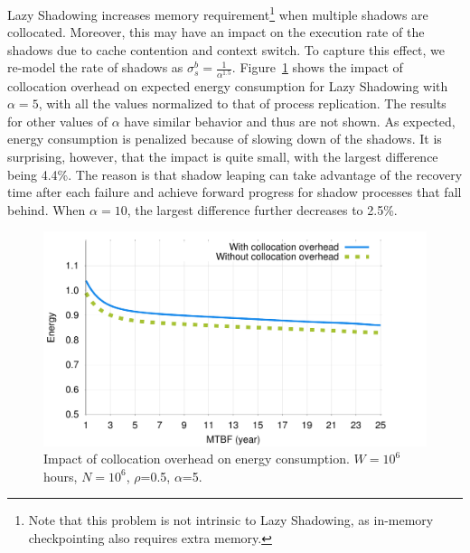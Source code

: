 
Lazy Shadowing increases memory requirement\footnote{Note that this problem is not intrinsic to Lazy Shadowing, as in-memory checkpointing also requires extra memory.} when multiple shadows are collocated. Moreover, this may have an impact on the execution rate of the shadows due to cache contention and context switch. 
To capture this effect,  
we re-model the rate of shadows as $\sigma_s^b=\frac{1}{\alpha^{1.5}}$.
Figure~\ref{fig:comp_vary_fail_speed} shows the impact of collocation overhead on expected energy consumption for Lazy Shadowing with $\alpha=5$, with all the values normalized to that of process replication. The results for other values of $\alpha$ have similar behavior and thus are not shown. As expected, energy consumption is penalized because
of slowing down of the shadows. It is surprising, however, that the impact is quite small, with the largest difference being 4.4\%. The reason is that shadow leaping can take advantage of the recovery time after each failure and achieve forward progress for shadow processes that fall behind. When $\alpha=10$, the largest difference further decreases to 2.5\%. 


\begin{figure}[t]
	\begin{center}
		\includegraphics[width=0.7\columnwidth]{Figures/collocation.pdf}
	\end{center}
	\caption{Impact of collocation overhead on energy consumption. $W=10^6$ hours, $N=10^6$, $\rho$=0.5, $\alpha$=5.}
	\label{fig:comp_vary_fail_speed}
\end{figure}
